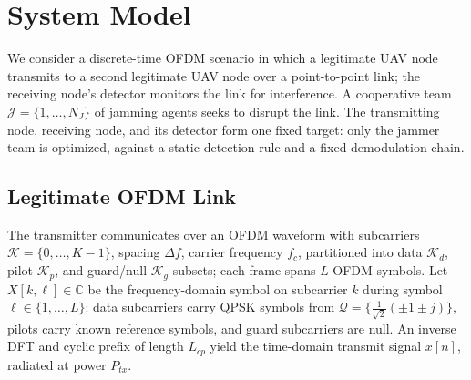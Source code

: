 \documentclass[conference]{IEEEtran}
\newcommand{\rar}[1]{{\color{blue}{[#1]}}}
\begin{document}
\section{System Model}
We consider a discrete-time OFDM scenario in which a legitimate UAV node
transmits to a second legitimate UAV node over a point-to-point link; the
receiving node's detector monitors the link for interference. A cooperative
team $\mathcal{J}=\{1,\ldots,N_J\}$ of jamming agents seeks to disrupt the
link. The transmitting node, receiving node, and its detector form one fixed
target: only the jammer team is optimized, against a
static detection rule and a fixed demodulation chain.
\rar{Legitimate nodes currently take fixed TX/RX roles; generalizing to
symmetric transceivers -- each node both transmitting, receiving, and
detecting, as in the eventual multi-node network -- is planned future work.}
\rar{A co-adaptive/learning defender is future work; the fixed-defender
setting isolates the jammer-side learning problem first.}

\subsection{Legitimate OFDM Link}
The transmitter communicates over an OFDM waveform with subcarriers
$\mathcal{K}=\{0,\ldots,K-1\}$, spacing $\Delta f$, carrier frequency $f_c$,
partitioned into data $\mathcal{K}_d$, pilot $\mathcal{K}_p$, and guard/null
$\mathcal{K}_g$ subsets; each frame spans $L$ OFDM symbols. Let
$X[k,\ell]\in\mathbb{C}$ be the frequency-domain symbol on subcarrier $k$
during symbol $\ell\in\{1,\ldots,L\}$: data subcarriers carry QPSK symbols
from $\mathcal{Q}=\{\tfrac{1}{\sqrt2}(\pm1\pm j)\}$, pilots carry known
reference symbols, and guard subcarriers are null. An inverse DFT and cyclic
prefix of length $L_{cp}$ yield the time-domain transmit signal $x[n]$,
radiated at power $P_{tx}$.
\end{document}

